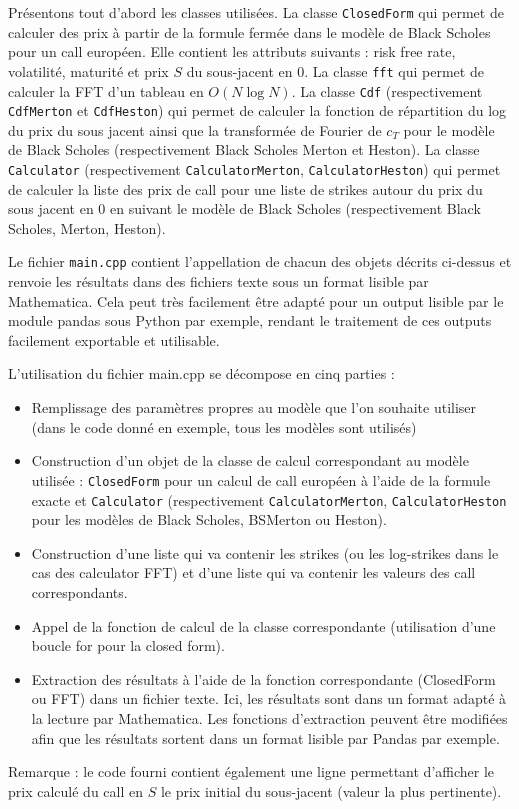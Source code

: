 \documentclass{article}
\begin{document}
Présentons tout d’abord les classes utilisées.
La classe \lstinline{ClosedForm} qui permet de calculer des prix à partir de la formule fermée dans le modèle de Black Scholes pour un call européen. Elle contient les attributs suivants : risk free rate, volatilité, maturité et prix $S$ du sous-jacent en 0.
La classe \lstinline{fft} qui permet de calculer la FFT d’un tableau en $O(N\log N)$.
La classe \lstinline{Cdf} (respectivement \lstinline{CdfMerton} et \lstinline{CdfHeston}) qui permet de calculer la fonction de répartition du log du prix du sous jacent ainsi que la transformée de Fourier de $c_T$ pour le modèle de Black Scholes (respectivement Black Scholes Merton et Heston).
La classe \lstinline{Calculator} (respectivement \lstinline{CalculatorMerton}, \lstinline{CalculatorHeston}) qui permet de calculer la liste des prix de call pour une liste de strikes autour du prix du sous jacent en 0 en suivant le modèle de Black Scholes (respectivement Black Scholes, Merton, Heston).


Le fichier \lstinline{main.cpp} contient l'appellation de chacun des objets décrits ci-dessus et renvoie les résultats dans des fichiers texte sous un format lisible par Mathematica. Cela peut très facilement être adapté pour un output lisible par le module pandas sous Python par exemple, rendant le traitement de ces outputs facilement exportable et utilisable.

L’utilisation du fichier main.cpp se décompose en cinq parties :
\begin{itemize}
	\item Remplissage des paramètres propres au modèle que l’on souhaite utiliser (dans le code donné en exemple, tous les modèles sont utilisés)
        \item Construction d’un objet de la classe de calcul correspondant au modèle utilisée : \lstinline{ClosedForm} pour un calcul de call européen à l’aide de la formule exacte et \lstinline{Calculator} (respectivement \lstinline{CalculatorMerton}, \lstinline{CalculatorHeston} pour les modèles de Black Scholes, BSMerton ou Heston).
	\item Construction d’une liste qui va contenir les strikes (ou les log-strikes dans le cas des calculator FFT) et d’une liste qui va contenir les valeurs des call correspondants.
	\item Appel de la fonction de calcul de la classe correspondante (utilisation d’une boucle for pour la closed form).
	\item Extraction des résultats à l’aide de la fonction correspondante (ClosedForm ou FFT) dans un fichier texte. Ici, les résultats sont dans un format adapté à la lecture par Mathematica. Les fonctions d’extraction peuvent être modifiées afin que les résultats sortent dans un format lisible par Pandas par exemple.
\end{itemize}
Remarque : le code fourni contient également une ligne permettant d’afficher le prix calculé du call en $S$ le prix initial du sous-jacent (valeur la plus pertinente).
\end{document}
